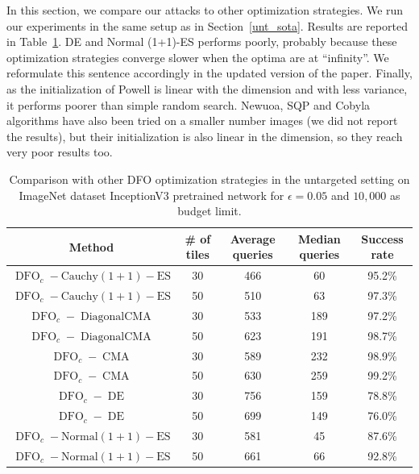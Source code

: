 \begin{subappendices}
In this section, we compare our attacks to other optimization strategies. We run our experiments in the same setup as in Section~\ref{unt_sota}. Results are reported in Table~\ref{untargeted_fail}. DE and Normal (1+1)-ES performs poorly, probably because these optimization strategies converge slower when the optima are at ``infinity''.  We reformulate this sentence accordingly in the updated version of the paper. Finally, as the initialization of Powell is linear with the dimension and with less variance, it performs poorer than simple random search. Newuoa, SQP and Cobyla algorithms have also been tried on a smaller number images (we did not report the results), but their initialization is also linear in the dimension, so they reach very poor results too.

\begin{table}[htb]
\caption{Comparison with other DFO optimization strategies in the untargeted setting on ImageNet dataset InceptionV3 pretrained network for $\epsilon=0.05$ and $10,000$ as budget limit.}
\label{untargeted_fail}
\begin{center}
\begin{tabular}{cc|cc|c}
\textbf{Method} & \textbf{\# of tiles} &  \textbf{Average queries} &\textbf{ Median queries }& \textbf{Success rate} \\
 \hline

$\operatorname{DFO}_c-\operatorname{Cauchy (1+1)-ES }$ &30&	466& 60	&95.2\%\\
$\operatorname{DFO}_c-\operatorname{Cauchy (1+1)-ES }$ &50&	510&	63	&97.3\% \\
\hline
$\operatorname{DFO}_c-\operatorname{DiagonalCMA}$ &30&	533	&189&	97.2\%\\
$\operatorname{DFO}_c-\operatorname{DiagonalCMA}$ &50&	623	&191&	98.7\%\\
\hline

$\operatorname{DFO}_c-\operatorname{CMA}$& 30&	589	&232	&98.9\%\\
$\operatorname{DFO}_c-\operatorname{CMA}$ & 50&	630	&259&	99.2\%\\

\hline

$\operatorname{DFO}_c-\operatorname{DE}$ & 30&756&159&78.8\%\\
$\operatorname{DFO}_c-\operatorname{DE}$ & 50&699&149	&76.0\%\\
\hline

$\operatorname{DFO}_c-\operatorname{Normal(1+1)-ES}$ &30&	581&	45	&87.6\%\\
$\operatorname{DFO}_c-\operatorname{Normal(1+1)-ES}$ &50&661&66&92.8\%\\
\hline


\end{tabular}
\end{center}
\end{table}
\end{subappendices}
